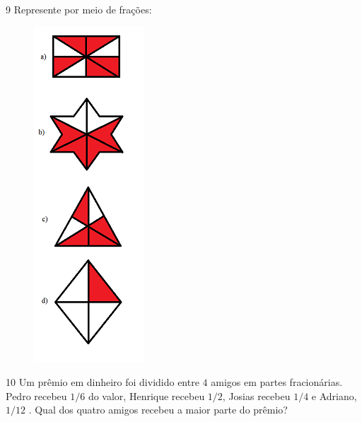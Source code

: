 \num{9}  Represente por meio de frações:

\begin{figure}
\includegraphics[width=1.61458in,height=4.94792in]{./imgSAEB_6_MAT/media/image34.png}
\end{figure}

\begin{escolha}
\item {}
\item {}
\item {}
\item {}
\end{escolha}


\num{10} Um prêmio em dinheiro foi dividido entre $4$ amigos em partes
fracionárias. Pedro recebeu $1/6$ do valor, Henrique recebeu $1/2$, Josias
recebeu $1/4$ e Adriano, $1/12$ . Qual dos quatro amigos recebeu a maior
parte do prêmio?



